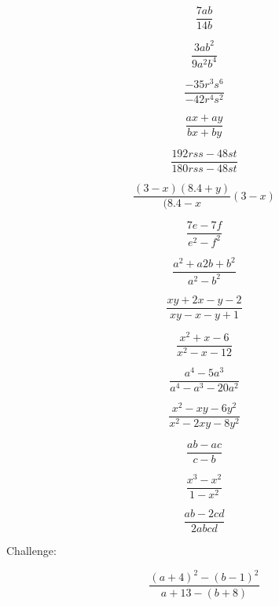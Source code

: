 {\begin{bbwAufgabenBlock}
\item $$\frac{7ab}{14b}$$

\item $$\frac{3ab^2}{9a^2b^4}$$

\item $$\frac{-35r^3s^6}{-42r^4s^2}$$

\item $$\frac{ax+ay}{bx+by}$$

\item $$\frac{192rss-48st}{180rss-48st}$$

\item $$\frac{(3-x)(8.4+y)}{(8.4-x}(3-x)$$

\item $$\frac{7e-7f}{e^2-f^2}$$

\item $$\frac{a^2+a2b+b^2}{a^2-b^2}$$

\item $$\frac{xy+2x-y-2}{xy-x-y+1}$$

\item $$\frac{x^2+x-6}{x^2-x-12}$$

\item $$\frac{a^4-5a^3}{a^4-a^3-20a^2}$$

\item $$\frac{x^2-xy-6y^2}{x^2-2xy-8y^2}$$

\item $$\frac{ab-ac}{c-b}$$

\item $$\frac{x^3-x^2}{1-x^2}$$

\item $$\frac{ab-2cd}{2abcd}$$

\vspace{3mm}
Challenge:

\item $$\frac{(a+4)^2-(b-1)^2}{a+13-(b+8)}$$



\end{bbwAufgabenBlock}}
